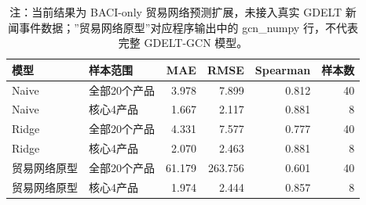 \begin{table}[H]
  \centering
  \caption{测试集预测指标比较}
  \label{tab:v03-metrics}
  \begin{tabular}{llrrrr}
    \toprule
    模型 & 样本范围 & MAE & RMSE & Spearman & 样本数 \\
    \midrule
    Naive & 全部20个产品 & 3.978 & 7.899 & 0.812 & 40 \\
    Naive & 核心4产品 & 1.667 & 2.117 & 0.881 & 8 \\
    Ridge & 全部20个产品 & 4.331 & 7.577 & 0.777 & 40 \\
    Ridge & 核心4产品 & 2.070 & 2.463 & 0.881 & 8 \\
    贸易网络原型 & 全部20个产品 & 61.179 & 263.756 & 0.601 & 40 \\
    贸易网络原型 & 核心4产品 & 1.974 & 2.444 & 0.857 & 8 \\
    \bottomrule
  \end{tabular}
  \caption*{注：当前结果为 BACI-only 贸易网络预测扩展，未接入真实 GDELT 新闻事件数据；”贸易网络原型”对应程序输出中的 gcn\_numpy 行，不代表完整 GDELT-GCN 模型。}
\end{table}
